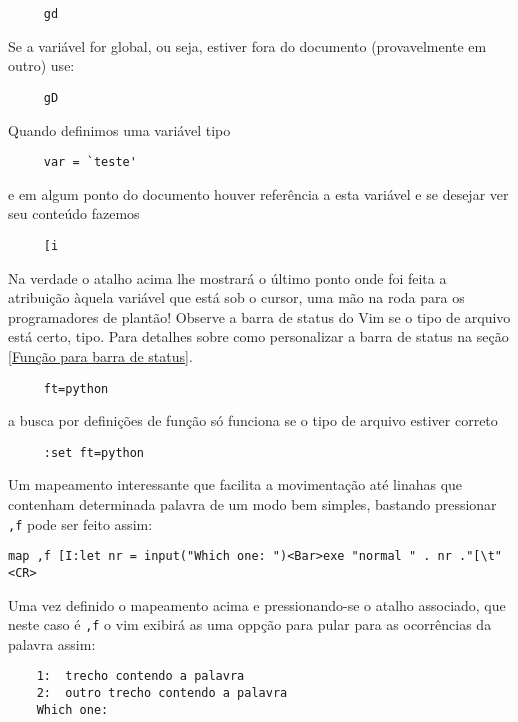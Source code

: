 \begin{verbatim}
     gd
\end{verbatim}

Se a variável for global, ou seja, estiver fora do documento
(provavelmente em outro) use:

\begin{verbatim}
     gD
\end{verbatim}

Quando definimos uma variável tipo

\begin{verbatim}
     var = `teste'
\end{verbatim}

e em algum ponto do documento houver referência a esta variável e se
desejar ver seu conteúdo fazemos

\begin{verbatim}
     [i
\end{verbatim}

Na verdade o atalho acima lhe mostrará o último ponto onde foi feita a
atribuição àquela variável que está sob o cursor, uma mão na roda para os
programadores de plantão!  {\Large {}} Observe a  barra de status do
Vim se o tipo de arquivo está certo, tipo. Para detalhes sobre como
personalizar a barra de status na seção \ref{Função para barra de status}.

\begin{verbatim}
     ft=python
\end{verbatim}

a busca por definições de função só funciona se o tipo de arquivo
estiver correto

\begin{verbatim}
     :set ft=python
\end{verbatim}

{\Large {}} Um mapeamento interessante que facilita a movimentação até
linahas  que contenham determinada palavra de um modo bem simples, bastando
pressionar \verb|,f| pode ser feito assim:

\begin{verbatim}
map ,f [I:let nr = input("Which one: ")<Bar>exe "normal " . nr ."[\t"<CR>
\end{verbatim}

Uma vez definido o mapeamento acima e pressionando-se o atalho associado, que
neste caso é \verb|,f| o vim exibirá as uma oppção para pular para as ocorrências 
da palavra assim:

\begin{verbatim}
    1:  trecho contendo a palavra
    2:  outro trecho contendo a palavra
    Which one: 
\end{verbatim}


